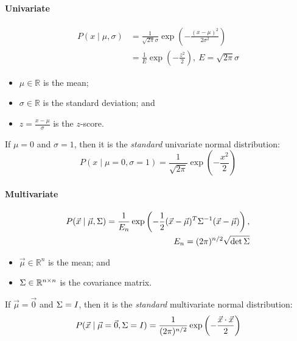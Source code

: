 \paragraph{Univariate}

\begin{dfn}
  \label{dfn:9:univariate-normal-distribution}
  \begin{align}
    P(x \mid \mu, \sigma)
     & = \frac{1}{\sqrt{2 \pi} \sigma} \exp \left( - \frac{(x - \mu)^2}{2 \sigma^2} \right) \\
     & = \frac{1}{E} \exp \left( - \frac{z^2}{2} \right) ,\
    E = \sqrt{2 \pi} \sigma
  \end{align}
  \begin{itemize}
    \item $\mu \in \mathbb{R}$ is the mean;
    \item $\sigma \in \mathbb{R}$ is the standard deviation; and
    \item $z = \frac{x - \mu}{\sigma}$ is the $z$-score.
  \end{itemize}
\end{dfn}
If $\mu = 0$ and $\sigma = 1$, then it is the \textit{standard} univariate
normal distribution:
\begin{equation}
  P(x \mid \mu = 0, \sigma = 1)
  = \frac{1}{\sqrt{2 \pi}} \exp \left( - \frac{x^2}{2} \right)
\end{equation}

\paragraph{Multivariate}

\begin{dfn}
  \label{dfn:9:multivariate-normal-distribution}
  \begin{equation}
    \begin{split}
      P(\vec{x} \mid \vec{\mu}, \Sigma)
      = \frac{1}{E_n} \exp \left(
      - \frac{1}{2} (\vec{x} - \vec{\mu})^T \Sigma^{-1} (\vec{x} - \vec{\mu})
      \right) ,\\
      E_n = (2 \pi)^{n/2} \sqrt{\det \Sigma}
    \end{split}
  \end{equation}
  \begin{itemize}
    \item $\vec{\mu} \in \mathbb{R}^n$ is the mean; and
    \item $\Sigma \in \mathbb{R}^{n \times n}$ is the covariance matrix.
  \end{itemize}
\end{dfn}
If $\vec{\mu} = \vec{0}$ and $\Sigma = I$, then it is the
\textit{standard} multivariate normal distribution:
\begin{equation}
  P(\vec{x} \mid \vec{\mu} = \vec{0}, \Sigma = I)
  = \frac{1}{(2 \pi)^{n / 2}} \exp \left( - \frac{\vec{x} \cdot \vec{x}}{2} \right)
\end{equation}

